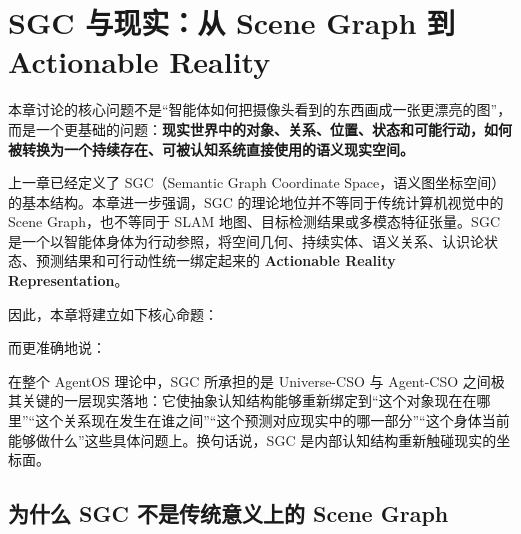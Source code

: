 \chapter{SGC 与现实：从 Scene Graph 到 Actionable Reality}
\label{chap:sgc-reality}

\begin{chapterlead}
本章讨论的核心问题不是“智能体如何把摄像头看到的东西画成一张更漂亮的图”，而是一个更基础的问题：\textbf{现实世界中的对象、关系、位置、状态和可能行动，如何被转换为一个持续存在、可被认知系统直接使用的语义现实空间。}

上一章已经定义了 SGC（Semantic Graph Coordinate Space，语义图坐标空间）的基本结构。本章进一步强调，SGC 的理论地位并不等同于传统计算机视觉中的 Scene Graph，也不等同于 SLAM 地图、目标检测结果或多模态特征张量。SGC 是一个以智能体身体为行动参照，将空间几何、持续实体、语义关系、认识论状态、预测结果和可行动性统一绑定起来的 \textbf{Actionable Reality Representation}。

因此，本章将建立如下核心命题：
\begin{statementbox}
\centering
{}
\end{statementbox}
\begin{statementbox}
\centering
{}
\end{statementbox}
\begin{statementbox}
\centering
{}
\end{statementbox}
而更准确地说：
\begin{statementbox}
\centering
{}
\end{statementbox}

在整个 AgentOS 理论中，SGC 所承担的是 Universe-CSO 与 Agent-CSO 之间极其关键的一层现实落地：它使抽象认知结构能够重新绑定到“这个对象现在在哪里”“这个关系现在发生在谁之间”“这个预测对应现实中的哪一部分”“这个身体当前能够做什么”这些具体问题上。换句话说，SGC 是内部认知结构重新触碰现实的坐标面。
\end{chapterlead}

\section{为什么 SGC 不是传统意义上的 Scene Graph}

